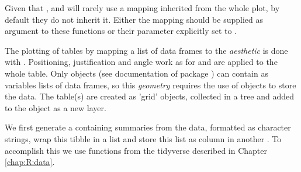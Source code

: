 \documentclass[krantz2]{krantz}\usepackage{knitr}%
\begin{document}
\begin{warningbox}
Given that  ,  and  will rarely use a mapping inherited from the whole plot, by default they do not inherit it. Either the mapping should be supplied as argument to these functions or their parameter  explicitly set to .
\end{warningbox}

The plotting of tables by mapping a list of data frames to the  \emph{aesthetic} is done with . Positioning, justification and angle work as for  and are applied to the whole table. Only  objects (see documentation of package ) can contain as variables lists of data frames, so this \emph{geometry} requires the use of  objects to store the data. The table(s) are created as 'grid'  objects, collected in a tree and added to the  object as a new layer.

We first generate a  containing summaries from the data, formatted as character strings, wrap this tibble in a list and store this list as column in another . To accomplish this we use functions from the tidyverse described in Chapter \ref{chap:R:data}.

\begin{knitrout}\footnotesize
{}\color{fgcolor}
\end{knitrout}
\end{document}
